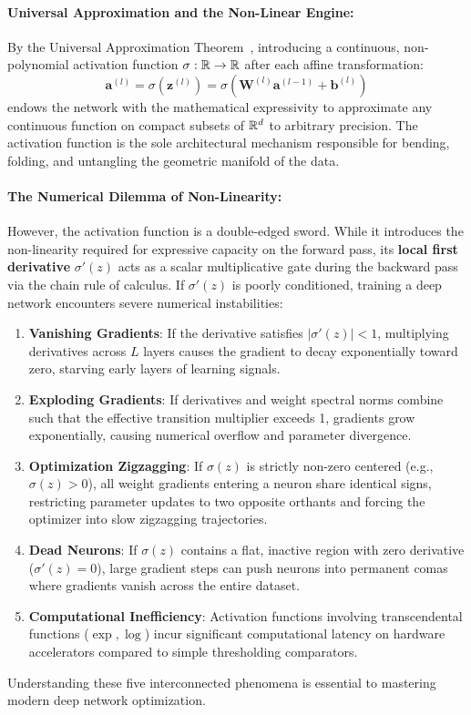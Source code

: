 \paragraph{Universal Approximation and the Non-Linear Engine:}
By the Universal Approximation Theorem~\cite{cybenko1989approximation,hornik1989multilayer}, introducing a continuous, non-polynomial activation function $\sigma: \mathbb{R} \to \mathbb{R}$ after each affine transformation:
\begin{equation}
\mathbf{a}^{(l)} = \sigma(\mathbf{z}^{(l)}) = \sigma\left(\mathbf{W}^{(l)} \mathbf{a}^{(l-1)} + \mathbf{b}^{(l)}\right)
\end{equation}
endows the network with the mathematical expressivity to approximate any continuous function on compact subsets of $\mathbb{R}^d$ to arbitrary precision. The activation function is the sole architectural mechanism responsible for bending, folding, and untangling the geometric manifold of the data.

\paragraph{The Numerical Dilemma of Non-Linearity:}
However, the activation function is a double-edged sword. While it introduces the non-linearity required for expressive capacity on the forward pass, its \textbf{local first derivative} $\sigma'(z)$ acts as a scalar multiplicative gate during the backward pass via the chain rule of calculus. 
If $\sigma'(z)$ is poorly conditioned, training a deep network encounters severe numerical instabilities:
\begin{enumerate}[noitemsep,topsep=2pt,parsep=0pt,partopsep=0pt]
  \item \textbf{Vanishing Gradients}: If the derivative satisfies $|\sigma'(z)| < 1$, multiplying derivatives across $L$ layers causes the gradient to decay exponentially toward zero, starving early layers of learning signals.
  \item \textbf{Exploding Gradients}: If derivatives and weight spectral norms combine such that the effective transition multiplier exceeds 1, gradients grow exponentially, causing numerical overflow and parameter divergence.
  \item \textbf{Optimization Zigzagging}: If $\sigma(z)$ is strictly non-zero centered (e.g., $\sigma(z) > 0$), all weight gradients entering a neuron share identical signs, restricting parameter updates to two opposite orthants and forcing the optimizer into slow zigzagging trajectories.
  \item \textbf{Dead Neurons}: If $\sigma(z)$ contains a flat, inactive region with zero derivative ($\sigma'(z) = 0$), large gradient steps can push neurons into permanent comas where gradients vanish across the entire dataset.
  \item \textbf{Computational Inefficiency}: Activation functions involving transcendental functions ($\exp, \log$) incur significant computational latency on hardware accelerators compared to simple thresholding comparators.
\end{enumerate}
Understanding these five interconnected phenomena is essential to mastering modern deep network optimization.

